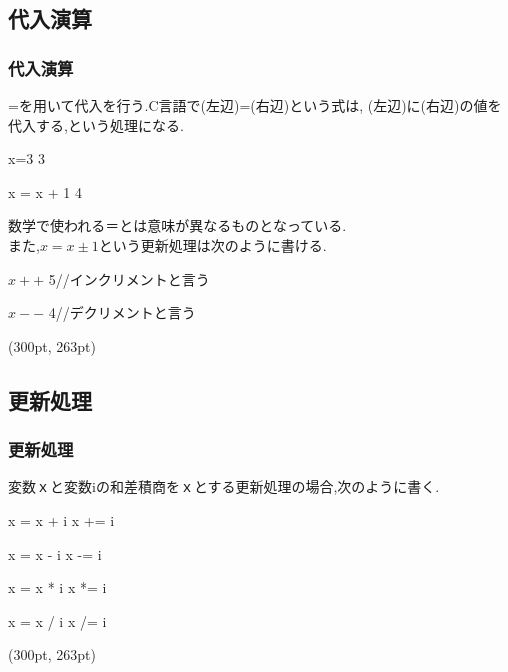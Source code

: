 \documentclass[dvipdfmx]{beamer}
\begin{document}
\subsection{代入演算}
\begin{frame}[t]
    \frametitle{代入演算}
    =を用いて代入を行う.\textrm{C}言語で(左辺)=(右辺)という式は,
    (左辺)に(右辺)の値を代入する,という処理になる.
    \begin{block}{x=3}
        3
    \end{block}
    \begin{block}{x = x + 1}
        4
    \end{block}
    数学で使われる＝とは意味が異なるものとなっている.\\
    また,$x=x\pm 1$という更新処理は次のように書ける.
    \begin{block}{$x++$}
        5\qquad //インクリメントと言う
    \end{block}
    \begin{block}{$x--$}
        4\qquad //デクリメントと言う
    \end{block}
    \begin{textblock*}{0.3\linewidth}(300pt, 263pt)
    \space
    \end{textblock*}
\end{frame}

\subsection{更新処理}
\begin{frame}[t]
    \frametitle{更新処理}
    変数ｘと変数iの和差積商をｘとする更新処理の場合,次のように書く.
    \begin{block}{x = x + i}
        x += i 
    \end{block}
    \begin{block}{x = x - i}
        x -= i
    \end{block}
    \begin{block}{x = x * i}
        x *= i
    \end{block}
    \begin{block}{x = x / i}
        x /= i
    \end{block}
    \begin{textblock*}{0.3\linewidth}(300pt, 263pt)
    \space
    \end{textblock*}
\end{frame}
\end{document}
